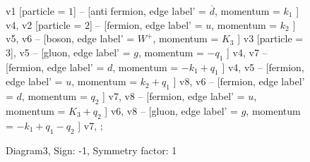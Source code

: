 \documentclass{revtex4}
\begin{document}
\begin{figure}[!htb]
\begin{center}
{    %
v1 [particle = \(1\)] -- [anti fermion, edge label' = \(\overline{d}\), momentum = \(k_{1}\) ] v4, 
v2 [particle = \(2\)] -- [fermion, edge label' = \(u\), momentum = \(k_{2}\) ] v5, 
v6 -- [boson, edge label' = \(W^{+}\), momentum = \(K_{3}\) ] v3 [particle = \(3\)], 
v5 -- [gluon, edge label' = \(g\), momentum = \(-q_{1}\) ] v4, 
v7 -- [fermion, edge label' = \(d\), momentum = \(-k_{1} + q_{1}\) ] v4, 
v5 -- [fermion, edge label' = \(u\), momentum = \(k_{2} + q_{1}\) ] v8, 
v6 -- [fermion, edge label' = \(d\), momentum = \(q_{2}\) ] v7, 
v8 -- [fermion, edge label' = \(u\), momentum = \(K_{3} + q_{2}\) ] v6, 
v8 -- [gluon, edge label' = \(g\), momentum = \(-k_{1} + q_{1} - q_{2}\) ] v7, 
};
\end{center}
\caption{Diagram3, Sign: -1, Symmetry factor: 1}
\end{figure}
\newpage
\end{document}
